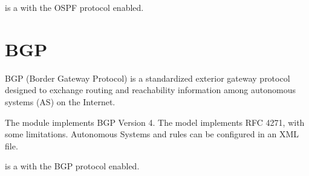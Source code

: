  is a  with the OSPF protocol enabled.


\section{BGP}
\label{sec:bgp}

BGP (Border Gateway Protocol) is a standardized exterior gateway protocol
designed to exchange routing and reachability information among
autonomous systems (AS) on the Internet.

The  module implements BGP Version 4. The model implements
RFC 4271, with some limitations. Autonomous Systems and rules can be
configured in an XML file.

 is a  with the BGP protocol enabled.


